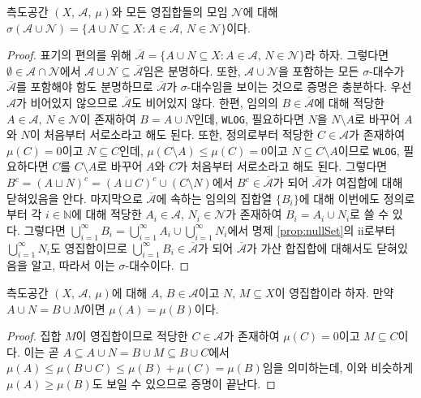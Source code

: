 \begin{proposition}\label{prop:completetionWellDefine1}
    측도공간 $(X,\,\mathcal{A},\,\mu)$와 모든 영집합들의 모임 $\mathcal{N}$에 대해 $\sigma(\mathcal{A}\cup\mathcal{N})=\{A\cup N\subseteq X:A\in\mathcal{A},\,N\in\mathcal{N}\}$이다.
\end{proposition}

\begin{proof}
    표기의 편의를 위해 $\overline{\mathcal{A}}=\{A\cup N\subseteq X:A\in\mathcal{A},\,N\in\mathcal{N}\}$라 하자. 그렇다면 $\emptyset\in\mathcal{A}\cap\mathcal{N}$에서 $\mathcal{A}\cup\mathcal{N}\subseteq\overline{\mathcal{A}}$임은 분명하다. 또한, $\mathcal{A}\cup\mathcal{N}$을 포함하는 모든 $\sigma$-대수가 $\overline{\mathcal{A}}$를 포함해야 함도 분명하므로 $\overline{\mathcal{A}}$가 $\sigma$-대수임을 보이는 것으로 증명은 충분하다. 우선 $\mathcal{A}$가 비어있지 않으므로 $\overline{\mathcal{A}}$도 비어있지 않다. 한편, 임의의 $B\in\overline{\mathcal{A}}$에 대해 적당한 $A\in\mathcal{A},\,N\in\mathcal{N}$이 존재하여 $B=A\cup N$인데, \texttt{WLOG}, 필요하다면 $N$을 $N\setminus A$로 바꾸어 $A$와 $N$이 처음부터 서로소라고 해도 된다. 또한, 정의로부터 적당한 $C\in\mathcal{A}$가 존재하여 $\mu(C)=0$이고 $N\subseteq C$인데, $\mu(C\setminus A)\leq\mu(C)=0$이고 $N\subseteq C\setminus A$이므로 \texttt{WLOG}, 필요하다면 $C$를 $C\setminus A$로 바꾸어 $A$와 $C$가 처음부터 서로소라고 해도 된다. 그렇다면 $B^c=(A\sqcup N)^c=(A\sqcup C)^c\cup(C\setminus N)$에서 $B^c\in\overline{\mathcal{A}}$가 되어 $\overline{\mathcal{A}}$가 여집합에 대해 닫혀있음을 안다. 마지막으로 $\overline{\mathcal{A}}$에 속하는 임의의 집합열 $\{B_i\}$에 대해 이번에도 정의로부터 각 $i\in\mathbb{N}$에 대해 적당한 $A_i\in\mathcal{A},\,N_i\in\mathcal{N}$가 존재하여 $B_i=A_i\cup N_i$로 쓸 수 있다. 그렇다면 $\bigcup_{i=1}^\infty B_i=\bigcup_{i=1}^\infty A_i\cup\bigcup_{i=1}^\infty N_i$에서 명제 \ref{prop:nullSet}의 ii로부터 $\bigcup_{i=1}^\infty N_i$도 영집합이므로 $\bigcup_{i=1}^\infty B_i\in\overline{\mathcal{A}}$가 되어 $\overline{\mathcal{A}}$가 가산 합집합에 대해서도 닫혀있음을 알고, 따라서 이는 $\sigma$-대수이다.
\end{proof}

\begin{proposition}\label{prop:completetionWellDefine2}
    측도공간 $(X,\,\mathcal{A},\,\mu)$에 대해 $A,\,B\in\mathcal{A}$이고 $N,\,M\subseteq X$이 영집합이라 하자. 만약 $A\cup N=B\cup M$이면 $\mu(A)=\mu(B)$이다.
\end{proposition}

\begin{proof}
    집합 $M$이 영집합이므로 적당한 $C\in\mathcal{A}$가 존재하여 $\mu(C)=0$이고 $M\subseteq C$이다. 이는 곧 $A\subseteq A\cup N=B\cup M\subseteq B\cup C$에서 $\mu(A)\leq\mu(B\cup C)\leq\mu(B)+\mu(C)=\mu(B)$임을 의미하는데, 이와 비슷하게 $\mu(A)\geq\mu(B)$도 보일 수 있으므로 증명이 끝난다.
\end{proof}

